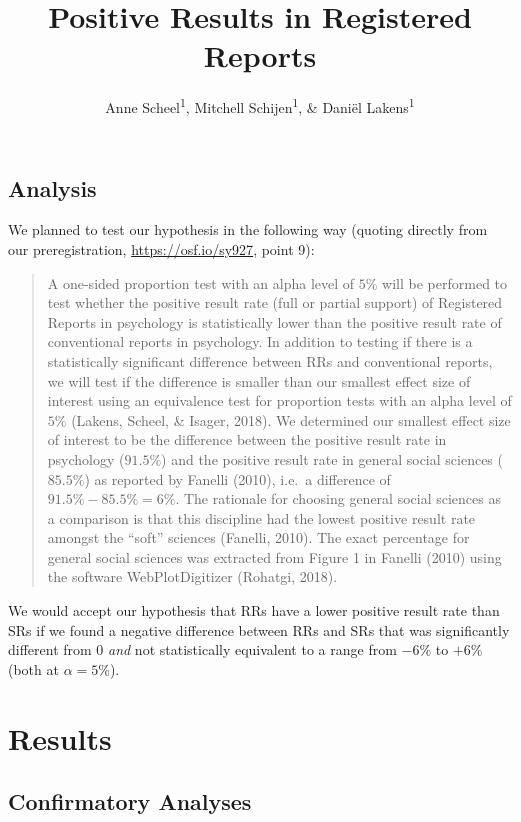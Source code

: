 \documentclass[british,,man,floatsintext]{apa6}
\affiliation{
\vspace{0.5cm}
\textsuperscript{1} Eindhoven University of Technology}
\title{Positive Results in Registered Reports}
\author{Anne Scheel\textsuperscript{1}, Mitchell Schijen\textsuperscript{1}, \& Daniël Lakens\textsuperscript{1}}
\date{}
\begin{document}
\maketitle

\hypertarget{analysis}{%
\subsection{Analysis}\label{analysis}}

We planned to test our hypothesis in the following way (quoting directly from our preregistration, \url{https://osf.io/sy927}, point 9):

\begin{quote}
A one-sided proportion test with an alpha level of \(5\%\) will be performed to test whether the positive result rate (full or partial support) of Registered Reports in psychology is statistically lower than the positive result rate of conventional reports in psychology.
In addition to testing if there is a statistically significant difference between RRs and conventional reports, we will test if the difference is smaller than our smallest effect size of interest using an equivalence test for proportion tests with an alpha level of \(5\%\) (Lakens, Scheel, \& Isager, 2018).
We determined our smallest effect size of interest to be the difference between the positive result rate in psychology (\(91.5\%\)) and the positive result rate in general social sciences (\(85.5\%\)) as reported by Fanelli (2010), i.e.~a difference of \(91.5\% - 85.5\% = 6\%\).
The rationale for choosing general social sciences as a comparison is that this discipline had the lowest positive result rate amongst the \enquote{soft} sciences (Fanelli, 2010).
The exact percentage for general social sciences was extracted from Figure 1 in Fanelli (2010) using the software WebPlotDigitizer (Rohatgi, 2018).
\end{quote}

We would accept our hypothesis that RRs have a lower positive result rate than SRs if we found a negative difference between RRs and SRs that was significantly different from 0 \emph{and} not statistically equivalent to a range from \(-6\%\) to \(+6\%\) (both at \(\alpha = 5\%\)).

\hypertarget{results}{%
\section{Results}\label{results}}

\hypertarget{confirmatory-analyses}{%
\subsection{Confirmatory Analyses}\label{confirmatory-analyses}}
\end{document}
